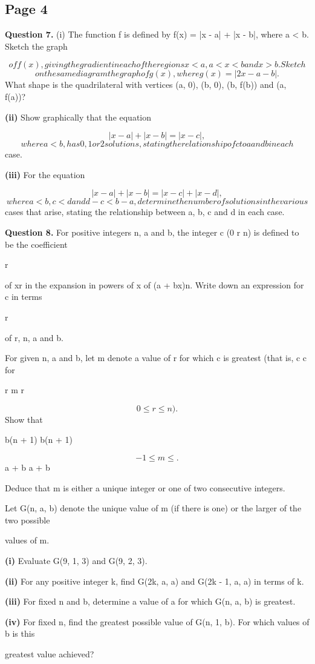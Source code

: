\documentclass[12pt]{article}
\begin{document}
\subsection*{Page 4}
\begin{flushleft}
\bigskip\textbf{Question 7.} (i) The function f is defined by f(x) = |x - a| + |x - b|, where a < b. Sketch the graph\par
\[of f(x), giving the gradient in each of the regions x < a, a < x < b and x > b. Sketch\]
\[on the same diagram the graph of g(x), where g(x) = |2x - a - b|.\]
What shape is the quadrilateral with vertices (a, 0), (b, 0), (b, f(b)) and (a, f(a))?\par
\textbf{(ii)} Show graphically that the equation\par
\[|x - a| + |x - b| = |x - c| ,\]
\[where a < b, has 0, 1 or 2 solutions, stating the relationship of c to a and b in each\]
case.\par
\textbf{(iii)} For the equation\par
\[|x - a| + |x - b| = |x - c| + |x - d| ,\]
\[where a < b, c < d and d - c < b - a, determine the number of solutions in the various\]
cases that arise, stating the relationship between a, b, c and d in each case.\par
\bigskip\textbf{Question 8.} For positive integers n, a and b, the integer c (0 \leq r \leq n) is defined to be the coefficient\par
r\par
of xr in the expansion in powers of x of (a + bx)n. Write down an expression for c in terms\par
r\par
of r, n, a and b.\par
For given n, a and b, let m denote a value of r for which c is greatest (that is, c \geq c for\par
r m r\par
\[0 \leq r \leq n).\]
Show that\par
b(n + 1) b(n + 1)\par
\[- 1 \leq m \leq .\]
a + b a + b\par
Deduce that m is either a unique integer or one of two consecutive integers.\par
Let G(n, a, b) denote the unique value of m (if there is one) or the larger of the two possible\par
values of m.\par
\textbf{(i)} Evaluate G(9, 1, 3) and G(9, 2, 3).\par
\textbf{(ii)} For any positive integer k, find G(2k, a, a) and G(2k - 1, a, a) in terms of k.\par
\textbf{(iii)} For fixed n and b, determine a value of a for which G(n, a, b) is greatest.\par
\textbf{(iv)} For fixed n, find the greatest possible value of G(n, 1, b). For which values of b is this\par
greatest value achieved?\par
\end{flushleft}
\end{document}
